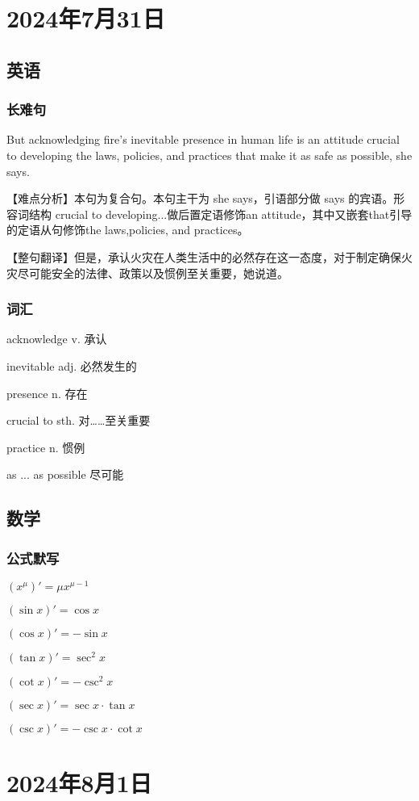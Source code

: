 \documentclass[UTF8]{ctexart}
\begin{document}
\section{2024年7月31日}
\subsection{英语}
\subsubsection{长难句}
But acknowledging fire's inevitable presence in human life is an attitude crucial to developing the laws, policies, and practices that make it as safe as possible, she says.

【难点分析】本句为复合句。本句主干为 she says，引语部分做 says 的宾语。形容词结构 crucial to developing...做后置定语修饰an attitude，其中又嵌套that引导的定语从句修饰the laws,policies, and practices。

【整句翻译】但是，承认火灾在人类生活中的必然存在这一态度，对于制定确保火灾尽可能安全的法律、政策以及惯例至关重要，她说道。
\subsubsection{词汇}
acknowledge v. 承认

inevitable  adj. 必然发生的

presence  n. 存在

crucial to sth. 对……至关重要

practice  n. 惯例

as ... as possible 尽可能
\subsection{数学}
\subsubsection{公式默写}
\begin{multicols}{3}
      ${(x^\mu)}'=\mu x^{\mu-1}$

      ${(\sin x)}'=\cos x$

      ${(\cos x)}'=-\sin x$

      ${(\tan x)}'=\sec^2 x$

      ${(\cot x)}'=-\csc^2 x$

      ${(\sec x)}'=\sec x\cdot\tan x$

      ${(\csc x)}'=-\csc x\cdot\cot x$
\end{multicols}
\section{2024年8月1日}
\end{document}
